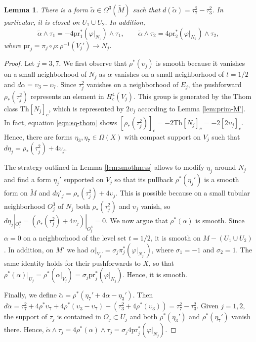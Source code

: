 \documentclass[10pt]{article}
\theoremstyle{plain}
\newtheorem{lem}[proposition]{Lemma}
\theoremstyle{definition}
\theoremstyle{remark}
\begin{document}
\begin{lem} \label{lem:prim-wtM}
There is a form $\widetilde{\alpha} \in \Omega^3(\widetilde{M})$ such that $d(\widetilde{\alpha})=\tau_7^2-\tau_3^2$.
In particular, it is closed on $U_1\cup U_2$. In addition,
$$
\widetilde{\alpha} \wedge \tau_1= -4\mathrm{pr}^*_1(\varphi|_{N_1}) \wedge \tau_1, \qquad
\widetilde{\alpha} \wedge \tau_2= 4\mathrm{pr}^*_2(\varphi|_{N_2}) \wedge \tau_2,
$$
where $\mathrm{pr}_j=\pi_j \circ \rho \colon \rho^{-1}(V_j') \to N_j$.
\end{lem}
\begin{proof}
Let $j=3,7$. We first observe that $\rho^*(\upsilon_j)$ is smooth because it vanishes on a small neighborhood of $N_j$ as $\alpha$ vanishes on a small neighborhood of $t=1/2$ and $d\alpha=\upsilon_3 -\upsilon_7$. Since $\tau_j^2$ vanishes on a neighborhood of $E_j$, the pushforward $\rho_*(\tau_j^2)$ represents an element in $H^4_c(V_j)$. 
This group is generated by the Thom class $\mathrm{Th}[N_j]_c$, which is represented by $2\upsilon_j$ according to Lemma \ref{lem:prim-M'}. In fact, equation \eqref{eqn:sq-thom} shows
$[\rho_*(\tau_j^2)]_c=-2\mathrm{Th}[N_j]_c=-2[2\upsilon_j]_c$. Hence, there are forms $\eta_3,\eta_7\in \Omega(X)$ with compact support on $V_j$ such that
$d\eta_j= \rho_*(\tau_j^2) +4\upsilon_j$.
 
The strategy outlined in Lemma \ref{lem:smothness} allows to modify $\eta_j$ around $N_j$ and find a form $\eta_j'$ supported on $V_j$
so that its pullback $\rho^*(\eta_j')$ is a smooth form on $\widetilde{M}$ and $d\eta'_j=\rho_*(\tau_j^2) +4\upsilon_j$. This is possible because on a small tubular neighborhood $O_j^3$ of $N_j$ both $\rho_*(\tau_j^2)$ and $\upsilon_j$ vanish, so
$d\eta_j|_{O_j^3}= (\rho_*(\tau_j^2) +4\upsilon_j)|_{O_j^3}=0$.  We now argue that $\rho^*(\alpha)$ is smooth. Since $\alpha=0$ on a neighborhood of the level set $t=1/2$, it is smooth on $M-(U_1\cup U_2)$. In addition, on $M'$ we had $\alpha|_{V_j'}=\sigma_j\pi_j^*(\varphi|_{N_j'})$, where  $\sigma_1=-1$ and $\sigma_2=1$. The same identity holds for their pushforwards to $X$, so that $\rho^*(\alpha)|_{U_j}=\rho^*(\alpha|_{V_j})= \sigma_j\mathrm{pr}_j^*(\varphi|_{N_j})$. Hence, it is smooth.

Finally, we define $\widetilde{\alpha}= \rho^*(\eta_7' +4 \alpha - \eta_3')$. Then $d\widetilde{\alpha}= \tau_7^2 + 4\rho^*\upsilon_7 + 4\rho^*(\upsilon_3 - \upsilon_7) - (\tau_3^2 + 4\rho^*(\upsilon_3))= \tau_7^2-\tau_3^2 $. Given $j=1,2$,  the support of $\tau_j$ is contained in $O_j\subset U_j$ and both $\rho^*(\eta_3')$ and $\rho^*(\eta_7')$ vanish there. Hence, 
$
\widetilde{\alpha} \wedge \tau_j= 4 \rho^*(\alpha)\wedge\tau_j= \sigma_j 4 \mathrm{pr}_j^*(\varphi|_{N_j}) .
$ 
\end{proof}
\end{document}
